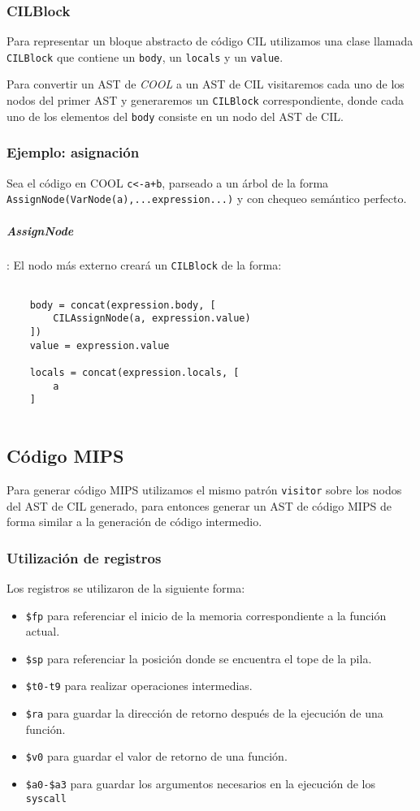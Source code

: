 \documentclass[a4paper,10pt,twocolumn]{article}
\begin{document}
\subsubsection{CILBlock}
Para representar un bloque abstracto de código CIL utilizamos una clase llamada \lstinline|CILBlock| que contiene un \lstinline|body|, un \lstinline|locals| y un \lstinline|value|. 

Para convertir un AST de \textit{COOL} a un AST de CIL visitaremos cada uno de los nodos del primer AST y generaremos un \lstinline|CILBlock| correspondiente, donde cada uno de los elementos del \lstinline|body| consiste en un nodo del AST de CIL.

\subsubsection{Ejemplo: asignación}
Sea el código en COOL \lstinline|c<-a+b|, parseado a un árbol de la forma \lstinline|AssignNode(VarNode(a),...expression...)| y con chequeo semántico perfecto. 

\subparagraph{AssignNode}: El nodo más externo creará un \lstinline|CILBlock| de la forma:
	\begin{lstlisting}
	
	body = concat(expression.body, [ 
		CILAssignNode(a, expression.value)
	])
	value = expression.value
	
	locals = concat(expression.locals, [
		a
	]
	
	\end{lstlisting}

\subsection{Código MIPS}

Para generar código MIPS utilizamos el mismo patrón \lstinline|visitor| sobre los nodos del AST de CIL generado, para entonces generar un AST de código MIPS de forma similar a la generación de código intermedio. 

\subsubsection{Utilización de registros}
Los registros se utilizaron de la siguiente forma:
\begin{itemize}
	\item \lstinline|$fp| para referenciar el inicio de la memoria correspondiente a la función actual.
	\item \lstinline|$sp| para referenciar la posición donde se encuentra el tope de la pila. 
	\item \lstinline|$t0-t9| para realizar operaciones intermedias. 
	\item \lstinline|$ra| para guardar la dirección de retorno después de la ejecución de una función. 
	\item \lstinline|$v0| para guardar el valor de retorno de una función. 
	\item \lstinline|$a0-$a3| para guardar los argumentos necesarios en la ejecución de los \lstinline|syscall|
\end{itemize}
\end{document}

